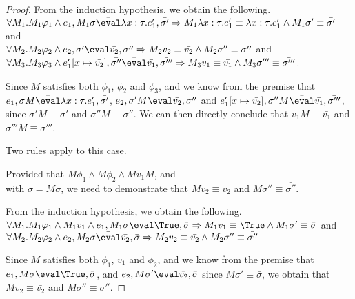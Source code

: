 \begin{proof}
{  From the induction hypothesis, we obtain the following.\\
  $\forall M_1 . M_1\phi_1 \land e_1,M_1\sigma\bar{\eval}\lambda x : \tau.\bar{e_1'},\bar{\sigma'}
  \implies M_1\lambda x : \tau.e_1' \equiv \lambda x : \tau.\bar{e_1'} \land M_1\sigma'\equiv\bar{\sigma'}$
  and\\
  $\forall M_2 . M_2\phi_2 \land e_2,\bar{\sigma'}\bar{\eval}\bar{v_2},\bar{\sigma''}
  \implies M_2 v_2 \equiv \bar{v_2} \land M_2\sigma'' \equiv\bar{\sigma''}$
  and\\
  $\forall M_3 . M_3\phi_3 \land \bar{e_1'}[x\mapsto \bar{v_2}],\bar{\sigma''}\bar{\eval}\bar{v_1},\bar{\sigma'''}
  \implies M_3 v_1\equiv \bar{v_1} \land M_3 \sigma'''\equiv\bar{\sigma'''}$.

  Since $M$ satisfies both $\phi_1$, $\phi_2$ and $\phi_3$, and we know from the premise that $e_1,\sigma M\bar{\eval}\lambda x : \tau.\bar{e_1'},\bar{\sigma'}$, $e_2,\sigma' M\bar{\eval}\bar{v_2},\bar{\sigma''}$ and $\bar{e_1'}[x\mapsto \bar{v_2}],\sigma'' M\bar{\eval}\bar{v_1},\bar{\sigma'''}$,
  since $\sigma' M\equiv\bar{\sigma'}$ and $\sigma'' M\equiv\bar{\sigma''}$.
  We can then directly conclude that $v_1 M \equiv \bar{v_1}$ and $\sigma''' M\equiv\bar{\sigma'''}$.
  }

  {Two rules apply to this case.\\
    {Provided that $M\phi_1 \land M\phi_2 \land M v_1 M$, and\\
     with $\bar{\sigma}=M \sigma$,
    we need to demonstrate that $M v_2 \equiv \bar{v_2}$ and $M \sigma''\equiv\bar{\sigma''}$.

    From the induction hypothesis, we obtain the following.\\
    $\forall M_1 .M_1 \phi_1 \land M_1 v_1 \land e_1,M_1 \sigma \bar{\eval}\True,\bar{\sigma}\implies M_1 v_1 \equiv \True \land M_1\sigma' \equiv\bar{\sigma}$ and\\
    $\forall M_2 . M_2 \phi_2 \wedge e_2,M_2 \sigma \bar{\eval}\bar{v_2},\bar{\sigma}\implies M_2 v_2\equiv \bar{v_2} \land M_2\sigma''\equiv\bar{\sigma''}$

    Since $M$ satisfies both $\phi_1$, $v_1$ and $\phi_2$,
    and we know from the premise that $e_1,M\sigma \bar{\eval}\True,\bar{\sigma}$,
    and $e_2,M\sigma' \bar{\eval}\bar{v_2},\bar{\sigma}$ since $M\sigma' \equiv \bar{\sigma}$,
    we obtain that $M v_2 \equiv \bar{v_2}$ and $M \sigma'' \equiv\bar{\sigma''}$.

}}
\end{proof}
